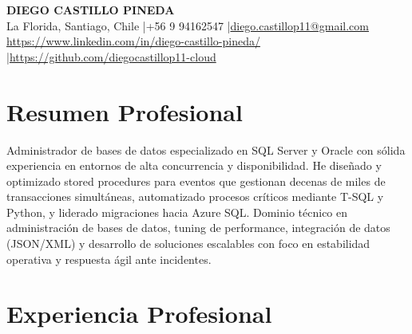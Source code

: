 \documentclass[11pt,letterpaper]{article}
\begin{document}
\begin{center}
{\fontsize{16}{19}\selectfont\textbf{\MakeUppercase{Diego Castillo Pineda}}}\\[4pt]
{\small La Florida, Santiago, Chile \quad|\quad +56 9 94162547 \quad|\quad \href{mailto:diego.castillop11@gmail.com}{diego.castillop11@gmail.com}\\
\href{https://https://www.linkedin.com/in/diego-castillo-pineda/}{https://www.linkedin.com/in/diego-castillo-pineda/} \quad|\quad \href{https://https://github.com/diegocastillop11-cloud}{https://github.com/diegocastillop11-cloud}}
\end{center}

\section{Resumen Profesional}
Administrador de bases de datos especializado en SQL Server y Oracle con sólida experiencia en entornos de alta concurrencia y disponibilidad. He diseñado y optimizado stored procedures para eventos que gestionan decenas de miles de transacciones simultáneas, automatizado procesos críticos mediante T-SQL y Python, y liderado migraciones hacia Azure SQL. Dominio técnico en administración de bases de datos, tuning de performance, integración de datos (JSON/XML) y desarrollo de soluciones escalables con foco en estabilidad operativa y respuesta ágil ante incidentes.

\section{Experiencia Profesional}
\end{document}
